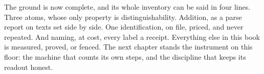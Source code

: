 The ground is now complete, and its whole inventory can be said in four lines. Three
atoms, whose only property is distinguishability. Addition, as a parse report on texts
set side by side. One identification, on file, priced, and never repeated. And naming,
at cost, every label a receipt. Everything else in this book is measured, proved, or
fenced. The next chapter stands the instrument on this floor: the machine that counts
its own steps, and the discipline that keeps its readout honest.
